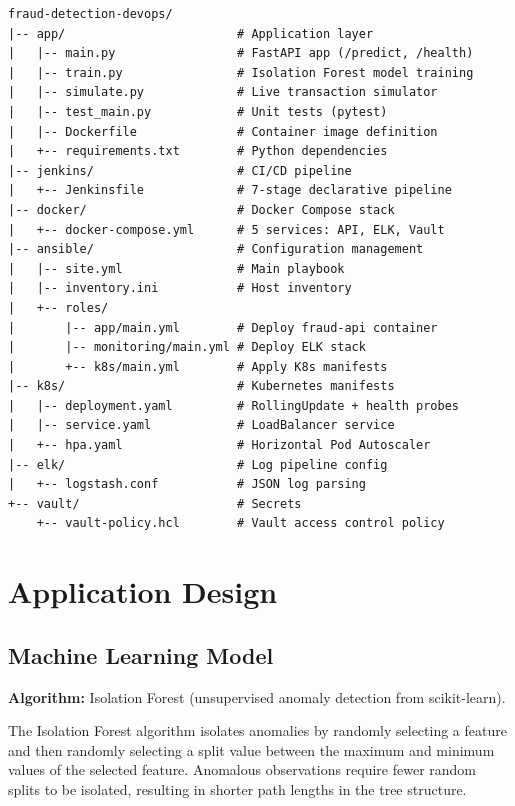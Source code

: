 \documentclass[12pt,a4paper]{article}
\begin{document}
\begin{lstlisting}[language={},caption={Repository Structure}]
fraud-detection-devops/
|-- app/                        # Application layer
|   |-- main.py                 # FastAPI app (/predict, /health)
|   |-- train.py                # Isolation Forest model training
|   |-- simulate.py             # Live transaction simulator
|   |-- test_main.py            # Unit tests (pytest)
|   |-- Dockerfile              # Container image definition
|   +-- requirements.txt        # Python dependencies
|-- jenkins/                    # CI/CD pipeline
|   +-- Jenkinsfile             # 7-stage declarative pipeline
|-- docker/                     # Docker Compose stack
|   +-- docker-compose.yml      # 5 services: API, ELK, Vault
|-- ansible/                    # Configuration management
|   |-- site.yml                # Main playbook
|   |-- inventory.ini           # Host inventory
|   +-- roles/
|       |-- app/main.yml        # Deploy fraud-api container
|       |-- monitoring/main.yml # Deploy ELK stack
|       +-- k8s/main.yml        # Apply K8s manifests
|-- k8s/                        # Kubernetes manifests
|   |-- deployment.yaml         # RollingUpdate + health probes
|   |-- service.yaml            # LoadBalancer service
|   +-- hpa.yaml                # Horizontal Pod Autoscaler
|-- elk/                        # Log pipeline config
|   +-- logstash.conf           # JSON log parsing
+-- vault/                      # Secrets
    +-- vault-policy.hcl        # Vault access control policy
\end{lstlisting}

\section{Application Design}

\subsection{Machine Learning Model}

\textbf{Algorithm:} Isolation Forest (unsupervised anomaly detection from scikit-learn).

The Isolation Forest algorithm isolates anomalies by randomly selecting a feature and then randomly selecting a split value between the maximum and minimum values of the selected feature. Anomalous observations require fewer random splits to be isolated, resulting in shorter path lengths in the tree structure.
\end{document}
